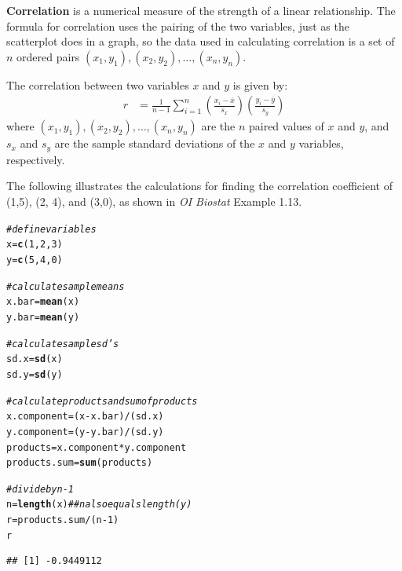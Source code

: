 \documentclass{report}\usepackage[]{graphicx}\usepackage[]{color}
\makeatletter
\newcommand{\hlnum}[1]{\textcolor[rgb]{0.686,0.059,0.569}{#1}}%
\newcommand{\hlcom}[1]{\textcolor[rgb]{0.678,0.584,0.686}{\textit{#1}}}%
\newcommand{\hlopt}[1]{\textcolor[rgb]{0,0,0}{#1}}%
\newcommand{\hlstd}[1]{\textcolor[rgb]{0.345,0.345,0.345}{#1}}%
\newcommand{\hlkwb}[1]{\textcolor[rgb]{0.69,0.353,0.396}{#1}}%
\newcommand{\hlkwd}[1]{\textcolor[rgb]{0.737,0.353,0.396}{\textbf{#1}}}%
\newenvironment{kframe}{%
 \def\at@end@of@kframe{}%
 \ifinner\ifhmode%
  \def\at@end@of@kframe{\end{minipage}}%
  \begin{minipage}{\columnwidth}%
 \fi\fi%
 \def\FrameCommand##1{\hskip\@totalleftmargin \hskip-\fboxsep
 \colorbox{shadecolor}{##1}\hskip-\fboxsep
     \hskip-\linewidth \hskip-\@totalleftmargin \hskip\columnwidth}%
 \MakeFramed {\advance\hsize-\width
   \@totalleftmargin\z@ \linewidth\hsize
   \@setminipage}}%
 {\par\unskip\endMakeFramed%
 \at@end@of@kframe}
\newenvironment{knitrout}{}{} %
\makeatother
\begin{document}
\textbf{Correlation} is a numerical measure of the strength of a linear relationship. The formula for correlation uses the pairing of the two variables, just as the scatterplot does in a graph, so the data used in calculating correlation is a set of $n$ ordered pairs $(x_1,y_1), (x_2,y_2), \ldots, (x_n, y_n) $.

The correlation between two variables $x$ and $y$ is given by:
		\begin{align*}
          r &=  \frac{1}{n-1}\sum^{n}_{i=1}
          \left(\frac{x_{i}-\overline{x}}
          {s_{x}}\right)\left(\frac{y_{i}-\overline{y}}{s_{y}}\right)
    \end{align*}      
where $(x_1,y_1), (x_2,y_2), \ldots, (x_n, y_n)$ are the $n$ paired values of $x$ and $y$, and $s_x$ and $s_y$ are the sample standard deviations of the $x$ and $y$ variables, respectively.     

The following illustrates the calculations for finding the correlation coefficient of (1,5), (2, 4), and (3,0), as shown in \textit{OI Biostat} Example 1.13.

\begin{knitrout}
\color{fgcolor}\begin{kframe}
\begin{alltt}
\hlcom{# define variables}
\hlstd{x} \hlkwb{=} \hlkwd{c}\hlstd{(}\hlnum{1}\hlstd{,} \hlnum{2}\hlstd{,} \hlnum{3}\hlstd{)}
\hlstd{y} \hlkwb{=} \hlkwd{c}\hlstd{(}\hlnum{5}\hlstd{,} \hlnum{4}\hlstd{,} \hlnum{0}\hlstd{)}

\hlcom{# calculate sample means}
\hlstd{x.bar} \hlkwb{=} \hlkwd{mean}\hlstd{(x)}
\hlstd{y.bar} \hlkwb{=} \hlkwd{mean}\hlstd{(y)}

\hlcom{# calculate sample sd's}
\hlstd{sd.x} \hlkwb{=} \hlkwd{sd}\hlstd{(x)}
\hlstd{sd.y} \hlkwb{=} \hlkwd{sd}\hlstd{(y)}

\hlcom{# calculate products and sum of products}
\hlstd{x.component} \hlkwb{=} \hlstd{(x} \hlopt{-} \hlstd{x.bar)}\hlopt{/}\hlstd{(sd.x)}
\hlstd{y.component} \hlkwb{=} \hlstd{(y} \hlopt{-} \hlstd{y.bar)}\hlopt{/}\hlstd{(sd.y)}
\hlstd{products} \hlkwb{=} \hlstd{x.component} \hlopt{*} \hlstd{y.component}
\hlstd{products.sum} \hlkwb{=} \hlkwd{sum}\hlstd{(products)}

\hlcom{# divide by n - 1}
\hlstd{n} \hlkwb{=} \hlkwd{length}\hlstd{(x)}   \hlcom{## n also equals length(y)}
\hlstd{r} \hlkwb{=} \hlstd{products.sum} \hlopt{/} \hlstd{(n} \hlopt{-} \hlnum{1}\hlstd{)}
\hlstd{r}
\end{alltt}
\begin{verbatim}
## [1] -0.9449112
\end{verbatim}
\end{kframe}
\end{knitrout}
\end{document}
